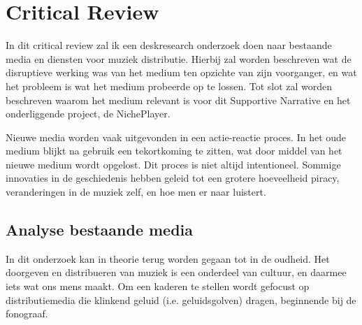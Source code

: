 \section{Critical Review}
\captionsetup[figure]{font=small,labelfont=bf}


In dit critical review zal ik een deskresearch onderzoek doen naar bestaande media en diensten voor muziek distributie. Hierbij zal worden beschreven wat de disruptieve werking was van het medium ten opzichte van zijn voorganger, en wat het probleem is wat het medium probeerde op te lossen. Tot slot zal worden beschreven waarom het medium relevant is voor dit Supportive Narrative en het onderliggende project, de NichePlayer.

Nieuwe media worden vaak uitgevonden in een actie-reactie proces. In het oude medium blijkt na gebruik een tekortkoming te zitten, wat door middel van het nieuwe medium wordt opgelost. Dit proces is niet altijd intentioneel. Sommige innovaties in de geschiedenis hebben geleid tot een grotere hoeveelheid piracy, veranderingen in de muziek zelf, en hoe men er naar luistert.


\subsection{Analyse bestaande media}
In dit onderzoek kan in theorie terug worden gegaan tot in de oudheid. Het doorgeven en distribueren van muziek is een onderdeel van cultuur, en daarmee iets wat ons mens maakt. Om een kaderen te stellen wordt gefocust op distributiemedia die klinkend geluid (i.e. geluidsgolven) dragen, beginnende bij de fonograaf.

